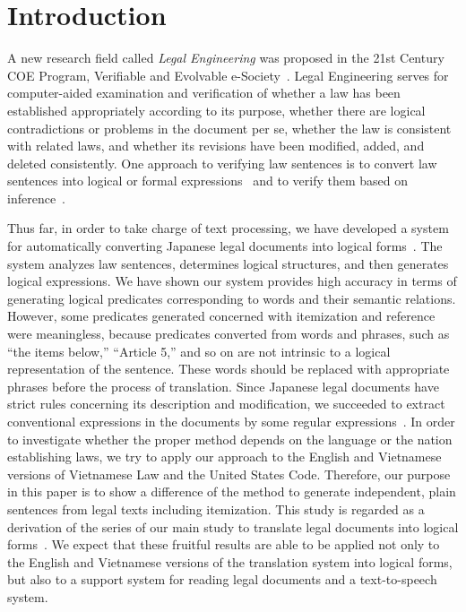 \documentclass[english]{jnlp_1.4}
\begin{document}
\maketitle

\section{Introduction}

A new research field called \textit{Legal Engineering} was proposed in
the 21st Century COE Program, Verifiable and Evolvable
e-Society~\cite{katayama05,katayama07,katayama08}.
Legal Engineering serves for computer-aided examination and verification
of whether a law has been established appropriately according to its purpose,
whether there are logical contradictions or problems in the document per se,
whether the law is consistent with related laws, and whether its
revisions have been modified, added, and deleted consistently.
One approach to verifying law sentences is to convert law sentences into
logical or formal expressions~\cite{nakamura07jurisin} and to verify them based on
inference~\cite{hagi06jurix,hagi06}.

Thus far, in order to take charge of text processing,
we have developed a system for automatically converting
Japanese legal documents into logical forms~\cite{nakamura07jurisin}.  
The system analyzes law
sentences, determines logical structures, and then generates logical
expressions. We have shown our system provides high accuracy in terms of 
generating logical predicates corresponding to words and their semantic
relations.
However, some predicates generated concerned with itemization and reference
were meaningless, because predicates converted from words and phrases,
such as ``the items below,'' ``Article 5,'' and so on are not intrinsic
to a logical representation of the sentence.
These words should be replaced with appropriate phrases
before the process of translation.
Since Japanese legal documents have strict rules concerning its description
and modification, we succeeded to extract conventional expressions in
the documents by some regular expressions~\cite{nakamura08jurisin_lnai}.
In order to investigate whether the proper method depends on the
language or the nation establishing laws, we try to apply our
approach to the English and Vietnamese versions of Vietnamese Law and
the United States Code.
Therefore, our purpose in this paper is to show a difference
of the method to generate independent, plain sentences from legal texts
including itemization. 
This study is regarded as a derivation of the series of our main study
to translate legal documents into logical forms~\cite{nakamura07jurisin}.
We expect that these fruitful results are able to be applied not only to
the English and Vietnamese versions of the translation system into logical forms, but 
also to a support system for reading legal documents and a text-to-speech
system.
\end{document}
